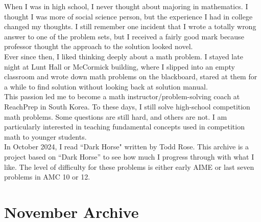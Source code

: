 \documentclass[12pt]{article}
\begin{document}
\begin{flushleft}
When I was in high school, I never thought about majoring in mathematics. I thought I was more of social science person, but the experience I had in college changed my thoughts. I still remember one incident that I wrote a totally wrong answer to one of the problem sets, but I received a fairly good mark because professor thought the approach to the solution looked novel.\\
\bigskip
Ever since then, I liked thinking deeply about a math problem. I stayed late night at Lunt Hall or McCormick building, where I slipped into an empty classroom and wrote down math problems on the blackboard, stared at them for a while to find solution without looking back at solution manual.\\
\bigskip
This passion led me to become a math instructor/problem-solving coach at ReachPrep in South Korea. To these days, I still solve high-school competition math problems. Some questions are still hard, and others are not. I am particularly interested in teaching fundamental concepts used in competition math to younger students.\\
\bigskip
In October 2024, I read ``Dark Horse" written by Todd Rose. This archive is a project based on ``Dark Horse'' to see how much I progress through with what I like. The level of difficulty for these problems is either early AIME or last seven problems in AMC 10 or 12.\\
\newpage


\section*{November Archive}




\end{flushleft}
\end{document}
